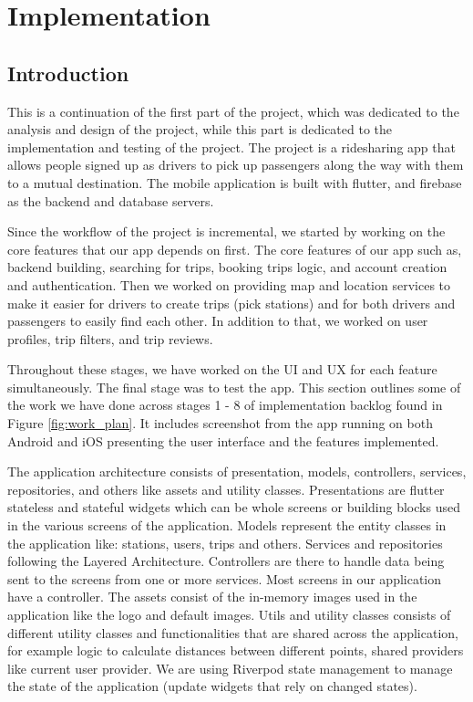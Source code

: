 \documentclass[a4paper, 12pt]{report} %
\begin{document}
    \pagebreak
    \section{Implementation}
        \subsection{Introduction}
            This is a continuation of the first part of the project, which was dedicated to the analysis and design of the project, while this part is dedicated to the implementation and testing of the project. The project is a ridesharing app that allows people signed up as drivers to pick up passengers along the way with them to a mutual destination. The mobile application is built with flutter, and firebase as the backend and database servers.

            Since the workflow of the project is incremental, we started by working on the core features that our app depends on first. The core features of our app such as, backend building, searching for trips, booking trips logic, and account creation and authentication. Then we worked on providing map and location services to make it easier for drivers to create trips (pick stations) and for both drivers and passengers to easily find each other. In addition to that, we worked on user profiles, trip filters, and trip reviews. 
            
            Throughout these stages, we have worked on the UI and UX for each feature simultaneously. The final stage was to test the app. This section outlines some of the work we have done across stages 1 - 8 of implementation backlog found in Figure \ref{fig:work_plan}. It includes screenshot from the app running on both Android and iOS presenting the user interface and the features implemented.

            The application architecture consists of presentation, models, controllers, services, repositories, and others like assets and utility classes. Presentations are flutter stateless and stateful widgets which can be whole screens or building blocks used in the various screens of the application. Models represent the entity classes in the application like: stations, users, trips and others. Services and repositories following the Layered Architecture. Controllers are there to handle data being sent to the screens from one or more services. Most screens in our application have a controller. The assets consist of the in-memory images used in the application like the logo and default images. Utils and utility classes consists of different utility classes and functionalities that are shared across the application, for example logic to calculate distances between different points, shared providers like current user provider. We are using Riverpod state management to manage the state of the application (update widgets that rely on changed states).
\end{document}
